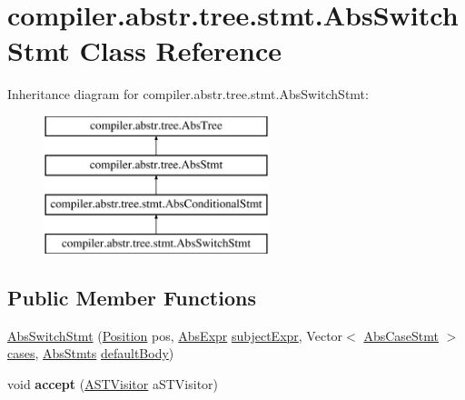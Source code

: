 \hypertarget{classcompiler_1_1abstr_1_1tree_1_1stmt_1_1_abs_switch_stmt}{}\section{compiler.\+abstr.\+tree.\+stmt.\+Abs\+Switch\+Stmt Class Reference}
\label{classcompiler_1_1abstr_1_1tree_1_1stmt_1_1_abs_switch_stmt}
Inheritance diagram for compiler.\+abstr.\+tree.\+stmt.\+Abs\+Switch\+Stmt\+:\begin{figure}[H]
\begin{center}
\leavevmode
\includegraphics[height=4.000000cm]{classcompiler_1_1abstr_1_1tree_1_1stmt_1_1_abs_switch_stmt}
\end{center}
\end{figure}
\subsection*{Public Member Functions}
\begin{DoxyCompactItemize}
\item 
\hyperlink{classcompiler_1_1abstr_1_1tree_1_1stmt_1_1_abs_switch_stmt_a467cbc851d97d21688f1378d7d8e13e6}{Abs\+Switch\+Stmt} (\hyperlink{classcompiler_1_1_position}{Position} pos, \hyperlink{classcompiler_1_1abstr_1_1tree_1_1expr_1_1_abs_expr}{Abs\+Expr} \hyperlink{classcompiler_1_1abstr_1_1tree_1_1stmt_1_1_abs_switch_stmt_a827d963b0b450513c19919645d325a81}{subject\+Expr}, Vector$<$ \hyperlink{classcompiler_1_1abstr_1_1tree_1_1stmt_1_1_abs_case_stmt}{Abs\+Case\+Stmt} $>$ \hyperlink{classcompiler_1_1abstr_1_1tree_1_1stmt_1_1_abs_switch_stmt_a471b6f000fe299a92e2135f1a3921f12}{cases}, \hyperlink{classcompiler_1_1abstr_1_1tree_1_1_abs_stmts}{Abs\+Stmts} \hyperlink{classcompiler_1_1abstr_1_1tree_1_1stmt_1_1_abs_switch_stmt_a2a8600e70568fe111d8a3e53a31a3516}{default\+Body})
\item 
\mbox{\label{classcompiler_1_1abstr_1_1tree_1_1stmt_1_1_abs_switch_stmt_a939eb2b4c2ae81b481acc1ae2b5086a7}} 
void {\bfseries accept} (\hyperlink{interfacecompiler_1_1abstr_1_1_a_s_t_visitor}{A\+S\+T\+Visitor} a\+S\+T\+Visitor)
\end{DoxyCompactItemize}
